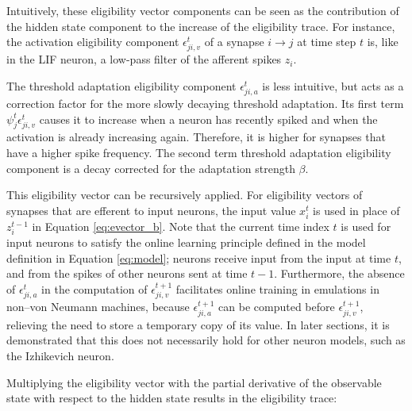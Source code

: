             Intuitively, these eligibility vector components can be seen as the contribution of the hidden state component to the increase of the eligibility trace.
            For instance, the activation eligibility component $\epsilon^t_{ji,v}$ of a synapse $i\rightarrow j$ at time step $t$ is, like in the LIF neuron, a low-pass filter of the afferent spikes $z_i$.

            The threshold adaptation eligibility component $\epsilon^t_{ji,a}$ is less intuitive, but acts as a correction factor for the more slowly decaying threshold adaptation.
            Its first term $\psi^t_j\epsilon^t_{ji,v}$ causes it to increase when a neuron has recently spiked and when the activation is already increasing again.
            Therefore, it is higher for synapses that have a higher spike frequency.
            The second term threshold adaptation eligibility component is a decay corrected for the adaptation strength $\beta$.

            This eligibility vector can be recursively applied.
            For eligibility vectors of synapses that are efferent to input neurons, the input value $x^t_i$ is used in place of $z_i^{t-1}$ in Equation \ref{eq:evector_b}.
            Note that the current time index $t$ is used for input neurons to satisfy the online learning principle defined in the model definition in Equation \ref{eq:model}; neurons receive input from the input at time $t$, and from the spikes of other neurons sent at time $t-1$.
            Furthermore, the absence of $\epsilon_{ji, a}^t$ in the computation of $\epsilon_{ji, v}^{t+1}$ facilitates online training in emulations in non--von Neumann machines, because $\epsilon_{ji, a}^{t+1}$ can be computed before $\epsilon_{ji, v}^{t+1}$, relieving the need to store a temporary copy of its value.
            In later sections, it is demonstrated that this does not necessarily hold for other neuron models, such as the Izhikevich neuron.

            Multiplying the eligibility vector with the partial derivative of the observable state with respect to the hidden state results in the eligibility trace:

